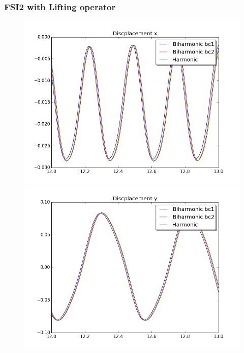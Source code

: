 \subsubsection{FSI2 with Lifting operator}
\begin{figure}[H]  \label{fig:FSI2_motion} 
  \begin{minipage}[b]{0.6\linewidth}
    \centering
    \includegraphics[scale=0.40]{./Mesh_motion_results/FSI2_dt001_dis_x.png} 
    \vspace{4ex}
  \end{minipage}%
  \begin{minipage}[b]{0.6\linewidth}
    \centering
    \includegraphics[scale=0.40]{./Mesh_motion_results/FSI2_dt001_dis_y.png} 

\end{minipage}
\end{figure}
